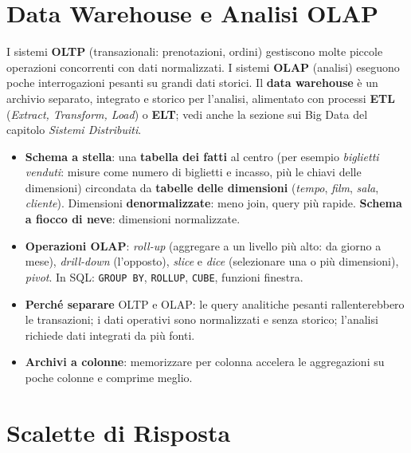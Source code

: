 \section{Data Warehouse e Analisi OLAP}
I sistemi \textbf{OLTP} (transazionali: prenotazioni, ordini) gestiscono molte piccole operazioni concorrenti con dati normalizzati. I sistemi \textbf{OLAP} (analisi) eseguono poche interrogazioni pesanti su grandi dati storici. Il \textbf{data warehouse} è un archivio separato, integrato e storico per l'analisi, alimentato con processi \textbf{ETL} (\emph{Extract, Transform, Load}) o \textbf{ELT}; vedi anche la sezione sui Big Data del capitolo \emph{Sistemi Distribuiti}.

\begin{itemize}
    \item \textbf{Schema a stella}: una \textbf{tabella dei fatti} al centro (per esempio \emph{biglietti venduti}: misure come numero di biglietti e incasso, più le chiavi delle dimensioni) circondata da \textbf{tabelle delle dimensioni} (\emph{tempo}, \emph{film}, \emph{sala}, \emph{cliente}). Dimensioni \textbf{denormalizzate}: meno join, query più rapide. \textbf{Schema a fiocco di neve}: dimensioni normalizzate.
    \item \textbf{Operazioni OLAP}: \emph{roll-up} (aggregare a un livello più alto: da giorno a mese), \emph{drill-down} (l'opposto), \emph{slice} e \emph{dice} (selezionare una o più dimensioni), \emph{pivot}. In SQL: \texttt{GROUP BY}, \texttt{ROLLUP}, \texttt{CUBE}, funzioni finestra.
    \item \textbf{Perché separare} OLTP e OLAP: le query analitiche pesanti rallenterebbero le transazioni; i dati operativi sono normalizzati e senza storico; l'analisi richiede dati integrati da più fonti.
    \item \textbf{Archivi a colonne}: memorizzare per colonna accelera le aggregazioni su poche colonne e comprime meglio.
\end{itemize}

\section{Scalette di Risposta}

